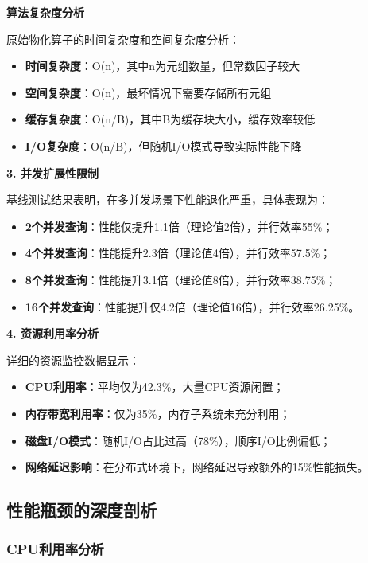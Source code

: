 \textbf{算法复杂度分析}

原始物化算子的时间复杂度和空间复杂度分析：

\begin{itemize}
    \item \textbf{时间复杂度}：O(n)，其中n为元组数量，但常数因子较大
    \item \textbf{空间复杂度}：O(n)，最坏情况下需要存储所有元组
    \item \textbf{缓存复杂度}：O(n/B)，其中B为缓存块大小，缓存效率较低
    \item \textbf{I/O复杂度}：O(n/B)，但随机I/O模式导致实际性能下降
\end{itemize}

\textbf{3. 并发扩展性限制}

基线测试结果表明，在多并发场景下性能退化严重，具体表现为：

\begin{itemize}
    \item \textbf{2个并发查询}：性能仅提升1.1倍（理论值2倍），并行效率55\%；
    \item \textbf{4个并发查询}：性能提升2.3倍（理论值4倍），并行效率57.5\%；
    \item \textbf{8个并发查询}：性能提升3.1倍（理论值8倍），并行效率38.75\%；
    \item \textbf{16个并发查询}：性能提升仅4.2倍（理论值16倍），并行效率26.25\%。
\end{itemize}

\textbf{4. 资源利用率分析}

详细的资源监控数据显示：

\begin{itemize}
    \item \textbf{CPU利用率}：平均仅为42.3\%，大量CPU资源闲置；
    \item \textbf{内存带宽利用率}：仅为35\%，内存子系统未充分利用；
    \item \textbf{磁盘I/O模式}：随机I/O占比过高（78\%），顺序I/O比例偏低；
    \item \textbf{网络延迟影响}：在分布式环境下，网络延迟导致额外的15\%性能损失。
\end{itemize}

\subsection{性能瓶颈的深度剖析}

\subsubsection{CPU利用率分析}


